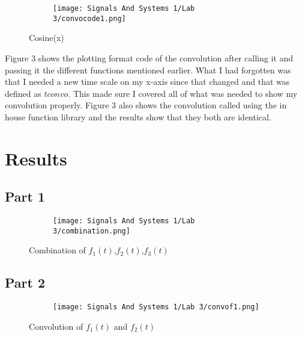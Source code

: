 \documentclass[12pt,a4paper]{article}
\begin{document}
\begin{figure}[h]
\centering
\begin{subfigure}{ 1\textwidth}
\texttt{[image: Signals And Systems 1/Lab 3/convocode1.png]}
\end{subfigure}
\caption{ Cosine(x)}
\label{fig2:image22}
\end{figure}

Figure 3 shows the plotting format code of the convolution after calling it and passing it the different functions mentioned earlier. What I had forgotten was that I needed a new time scale on my x-axis since that changed and that was defined as $tconvo$. This made sure I covered all of what was needed to show my convolution properly. Figure 3 also shows the convolution called using the in house function library and the results show that they both are identical. 


\section{Results}\label{sec:res}

\subsection{Part 1}

\begin{figure}[h]
\centering
\begin{subfigure}{ 1\textwidth}
\texttt{[image: Signals And Systems 1/Lab 3/combination.png]}
\end{subfigure}
\caption{ Combination of $f_1(t)$,$f_2(t)$,$f_3(t)$}
\label{fig2:image22}
\end{figure}



\subsection{Part 2}

\begin{figure}[h]
\centering
\begin{subfigure}{ 1\textwidth}
\texttt{[image: Signals And Systems 1/Lab 3/convof1.png]}
\end{subfigure}
\caption{ Convolution of $f_1(t)$ and $f_2(t)$ }
\label{fig2:image22}
\end{figure}


\newpage
\end{document}
